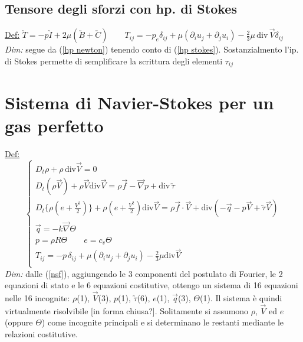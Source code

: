 \documentclass[11pt,a4paper]{report}
\begin{document}
		\subsection{Tensore degli sforzi con hp. di Stokes}
		\underline{Def:} $\utilde T=-p\utilde I+2\mu(\utilde B+\utilde C)\qquad	T_{ij}=-p_e\delta_{ij}+\mu(\partial_iu_j+\partial_ju_i)-\frac 23 \mu\,\mathrm{div}\,\vec V\delta_{ij}$\\
		\textit{Dim:} segue da (\ref{hp newton}) tenendo conto di (\ref{hp stokes}). Sostanzialmento l'ip. di Stokes permette di semplificare la scrittura degli elementi $\tau_{ij}$
			
	\section{Sistema di Navier-Stokes per un gas perfetto} \label{nsgp}
	\underline{Def:}$$\begin{cases}
	D_t\rho+\rho\,\mathrm{div}\vec V=0\\
	D_t(\rho\vec V)+\rho\vec V\mathrm{div}\vec V=\rho\vec f-\vec\nabla p+\mathrm{div}\,\utilde\tau\\
	D_t\{\rho(e+\frac{V^2}{2})\}+\rho(e+\frac{V^2}{2})\mathrm{div}\vec V=\rho\vec f\cdot\vec V+\mathrm{div}(-\vec q-p\vec V+\utilde\tau\vec V)\\
	\vec q=-k\vec\nabla\Theta\\
	p=\rho R \Theta\qquad e=c_v\Theta\\
	T_{ij}=-p\,\delta_{ij}+\mu(\partial_iu_j+\partial_ju_i)-\frac 23\mu\mathrm{div}\vec V\\
	\end{cases}$$
	\textit{Dim:} dalle (\ref{nsf}), aggiungendo le 3 componenti del postulato di Fourier, le 2 equazioni di stato e le 6 equazioni costitutive, ottengo un sistema di 16 equazioni nelle 16 incognite: $\rho$(1), $\vec V$(3), $p$(1), $\utilde\tau$(6), $e$(1), $\vec q$(3), $\Theta$(1). Il sistema è quindi virtualmente risolvibile [in forma chiusa?]. Solitamente si assumono $\rho$, $\vec V$ ed $e$ (oppure $\Theta$) come incognite principali e si determinano le restanti mediante le relazioni costitutive.
	
\end{document}
